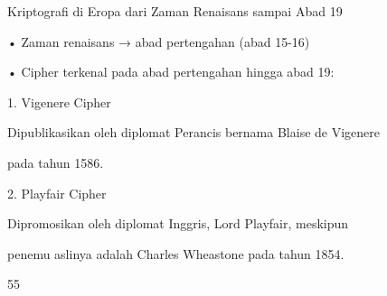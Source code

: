 \documentclass{article}
\begin{document}

Kriptografi di Eropa dari Zaman Renaisans sampai Abad 19

• Zaman renaisans → abad pertengahan (abad 15-16)

• Cipher terkenal pada abad pertengahan hingga abad 19: 

   1. Vigenere Cipher 

       Dipublikasikan oleh diplomat Perancis bernama Blaise de Vigenere 

pada tahun 1586.

    2. Playfair Cipher

        Dipromosikan oleh diplomat Inggris, Lord Playfair, meskipun  

penemu aslinya adalah Charles Wheastone pada tahun 1854.

55
\end{document}
